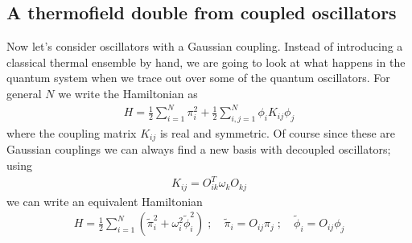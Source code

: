 \documentclass[a4paper,11pt]{article}
\begin{document}
\subsection{A thermofield double from coupled oscillators}
Now let's consider oscillators with a Gaussian coupling. Instead of introducing a classical thermal ensemble by hand,
we are going to look at what happens in the quantum system when we trace out over some of the quantum oscillators.
For general $N$ we write the Hamiltonian as
\begin{eqnarray}
H = \frac{1}{2} \sum_{i=1}^{N} \pi_i^2 + \frac{1}{2}  \sum_{i,j=1}^{N} \phi_i K_{ij} \phi_j
\label{eq:HK}
\end{eqnarray}
where the coupling matrix $K_{ij}$ is real and symmetric. Of course since these are Gaussian couplings we
can always find a new basis with decoupled oscillators; using
\begin{eqnarray}
K_{ij} = O^T_{ik} \omega_k O_{kj}
\end{eqnarray}
we can write an equivalent Hamiltonian
\begin{eqnarray}
H =   \frac{1}{2} \sum_{i=1}^{N} \left( \tilde{\pi}_i^2 + \omega_i^2\tilde{\phi}_i^2 \right) \; ; \quad
\tilde{\pi}_i = O_{ij}\pi_j \; ;\quad \tilde{\phi}_i = O_{ij}\phi_j 
\end{eqnarray}
\end{document}
